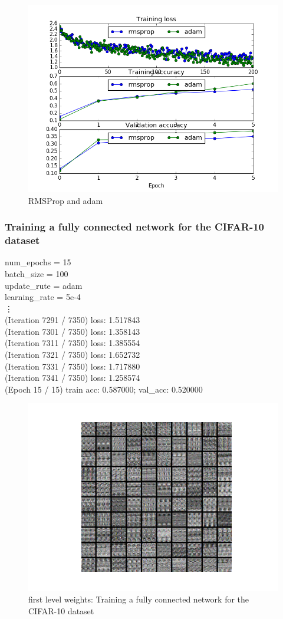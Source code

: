 \documentclass{article}
\begin{document}
\begin{figure}[H]
\centering
\includegraphics[width=0.5\linewidth]{./figure_3_1_11}
\caption{RMSProp and adam}
\label{fig:3_1_11}
\end{figure}

\subsubsection{Training a fully connected network for the CIFAR-10 dataset}
{\footnotesize
num\_epochs = 15\\
batch\_size = 100\\
update\_rute = adam\\
learning\_rate = 5e-4\\
\vdots\\
(Iteration 7291 / 7350) loss: 1.517843\\
(Iteration 7301 / 7350) loss: 1.358143\\
(Iteration 7311 / 7350) loss: 1.385554\\
(Iteration 7321 / 7350) loss: 1.652732\\
(Iteration 7331 / 7350) loss: 1.717880\\
(Iteration 7341 / 7350) loss: 1.258574\\
(Epoch 15 / 15) train acc: 0.587000; val\_acc: 0.520000\\
}
\begin{figure}[H]
\centering
\includegraphics[width=1.0\linewidth]{./figure_3_1_12}
\caption{first level weights: Training a fully connected network for the CIFAR-10 dataset}
\label{fig:3_1_12}
\end{figure}
\end{document}

